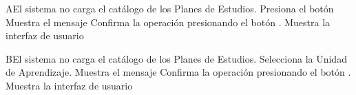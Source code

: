 
\begin{comment}
\begin{UCtrayectoriaA}{A}{El sistema no encuentra ningún formulario para mostrar.}
	\UCpaso No encuentra ningún formulario para mostrar.
    \UCpaso El sistema muestra el mensaje \MSGref{MSG6}{Por el momento no se puede registrar la bibliografía}.
    \UCpaso[\UCactor] Cierra el mensaje presionando el botón \IUbutton{Aceptar}.
    \UCpaso Continua en el paso 1 de la trayectoria principal del \UCref{CU1}.
\end{UCtrayectoriaA}
\end{comment}


\begin{UCtrayectoriaA}{A}{El sistema no carga el catálogo de los Planes de Estudios.}
	\UCpaso[\UCactor] Presiona el botón 
	\UCpaso Muestra el mensaje 
	\UCpaso[\UCactor] Confirma la operación presionando el botón .
	 \UCpaso Muestra la interfaz de usuario 

\end{UCtrayectoriaA}





\begin{UCtrayectoriaA}{B}{El sistema no carga el catálogo de los Planes de Estudios.}
	\UCpaso[\UCactor]Selecciona la Unidad de Aprendizaje.
	\UCpaso Muestra el mensaje 
	\UCpaso[\UCactor] Confirma la operación presionando el botón .
	\UCpaso Muestra la interfaz de usuario 

\end{UCtrayectoriaA}
